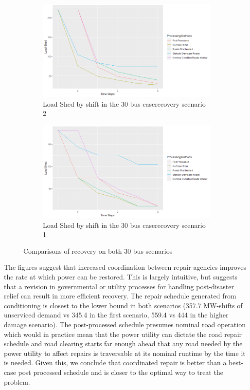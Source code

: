\documentclass[10pt]{article}
\begin{document}
\begin{figure}
	\centering
	\begin{subfigure}{.5\textwidth}
		\centering
		\includegraphics[width=.9\linewidth]{Rplot30Scenario2Fixed.png}
		\caption{Load Shed by shift in the 30 bus case\newline recovery scenario 2}
		\label{fig:sub1}
	\end{subfigure}%
	\begin{subfigure}{.5\textwidth}
		\centering
		\includegraphics[width=.9\linewidth]{Rplot37Fixed.png}
		\caption{Load Shed by shift in the 30 bus case\newline recovery scenario 1}
		\label{fig:sub2}
	\end{subfigure}
	\caption{Comparisons of recovery on both 30 bus scenarios}
\end{figure}
The figures suggest that increased coordination between repair agencies improves the rate at which power can be restored. This is largely intuitive, but suggests that a revision in governmental or utility processes for handling post-disaster relief can result in more efficient recovery. The repair schedule generated from conditioning is closest to the lower bound in both scenarios (357.7 MW-shifts of unserviced demand vs 345.4 in the first scenario, 559.4 vs 444 in the higher damage scenario). The post-processed schedule presumes nominal road operation which would in practice mean that the power utility can dictate the road repair schedule and road clearing starts far enough ahead that any road needed by the power utility to affect repairs is traversable at its nominal runtime by the time it is needed. Given this, we conclude that coordinated repair is better than a best-case post processed schedule and is closer to the optimal way to treat the problem.
\end{document}
